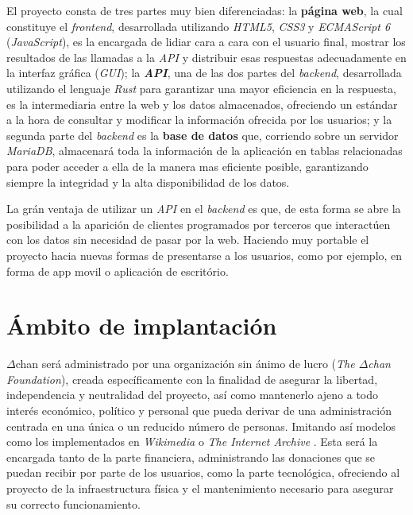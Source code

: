 \documentclass[12pt,a4paper,titlepage]{article}
\newcommand\projectname{$\Delta$chan}
\begin{document}
    El proyecto consta de tres partes muy bien diferenciadas: la \textbf{página web}, la cual constituye el \textit{frontend}, desarrollada utilizando \emph{HTML5}, \emph{CSS3} y \emph{ECMAScript 6} (\emph{JavaScript}), es la encargada de lidiar cara a cara con el usuario final, mostrar los resultados de las llamadas a la \emph{API} y distribuir esas respuestas adecuadamente en la interfaz gráfica (\emph{GUI}); la \emph{\textbf{API}}, una de las dos partes del \textit{backend}, desarrollada utilizando el lenguaje \emph{Rust} para garantizar una mayor eficiencia en la respuesta, es la intermediaria entre la web y los datos almacenados, ofreciendo un estándar a la hora de consultar y modificar la información ofrecida por los usuarios; y la segunda parte del \textit{backend} es la \textbf{base de datos} que, corriendo sobre un servidor \emph{MariaDB}, almacenará toda la información de la aplicación en tablas relacionadas para poder acceder a ella de la manera mas eficiente posible, garantizando siempre la integridad y la alta disponibilidad de los datos.

    La grán ventaja de utilizar un \emph{API} en el \textit{backend} es que, de esta forma se abre la posibilidad a la aparición de clientes programados por terceros que interactúen con los datos sin necesidad de pasar por la web. Haciendo muy portable el proyecto hacia nuevas formas de presentarse a los usuarios, como por ejemplo, en forma de app movil o aplicación de escritório.

    \section{Ámbito de implantación}



    {\projectname} será administrado por una organización sin ánimo de lucro (\textit{The {\projectname} Foundation}), creada específicamente con la finalidad de asegurar la libertad, independencia y neutralidad del proyecto, así como mantenerlo ajeno a todo interés económico, político y personal que pueda derivar de una administración centrada en una única o un reducido número de personas. Imitando así modelos como los implementados en \emph{Wikimedia} \cite{wikimedia:about} o \emph{The Internet Archive} \cite{internetarchive:about}. Esta será la encargada tanto de la parte financiera, administrando las donaciones que se puedan recibir por parte de los usuarios, como la parte tecnológica, ofreciendo al proyecto de la infraestructura física y el mantenimiento necesario para asegurar su correcto funcionamiento.
    
\end{document}
